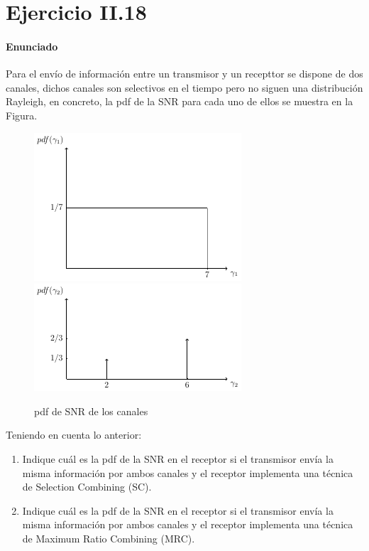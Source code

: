 \documentclass[fleqn,14pt]{article}
\begin{document}
\newpage
\section*{Ejercicio II.18}
\paragraph{Enunciado}
Para el envío de información entre un transmisor y un recepttor se dispone de dos canales, dichos canales son selectivos en el tiempo pero no siguen una distribución Rayleigh, en concreto, la pdf de la SNR para cada uno de ellos se muestra en la Figura.


  \begin{figure}[htbp]
    \centering
    \includegraphics{images/enunciado18(gamma1)}
    \includegraphics{images/gamma2}
    \caption{pdf de SNR de los canales}
  \end{figure}

Teniendo en cuenta lo anterior:
\begin{enumerate}[1.]
  \item Indique cuál es la pdf de la SNR en el receptor si el transmisor envía la misma información
  por ambos canales y el receptor implementa una técnica de Selection Combining
  (SC). \\
  \item Indique cuál es la pdf de la SNR en el receptor si el transmisor envía la misma información por ambos canales y el receptor implementa una técnica de Maximum Ratio Combining (MRC).
\end{enumerate}
\end{document}

